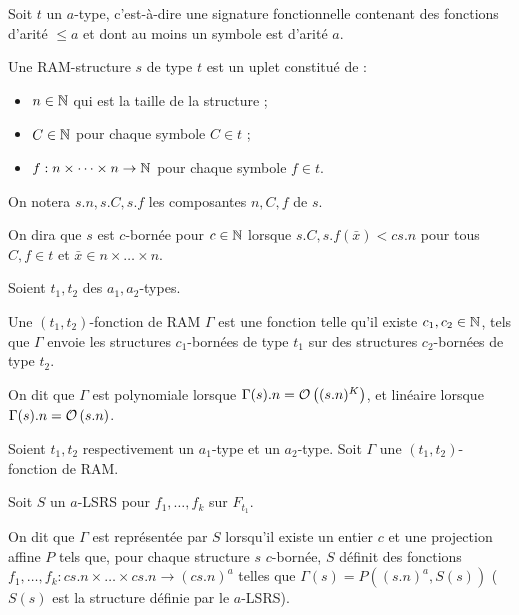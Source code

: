\documentclass{report}
\begin{document}
		\begin{definition}
			\label{def:RAM_data_structures_a}
			Soit $t$ un $a$-type, c'est-à-dire une signature fonctionnelle contenant des fonctions d'arité $\leqslant a$ et dont au moins un symbole est d'arité $a$. 
			
			Une RAM-structure $s$ de type $t$ est un uplet constitué de :
			\begin{itemize}[itemsep=-1mm]
				\item 	$n \in \mathbb{N}$ qui est la taille de la structure ;
				\item 	$C \in \mathbb{N}$ pour chaque symbole $C \in t$ ;
				\item 	$f : n\times \dots \times n \to \mathbb{N}$ pour chaque symbole $f \in t$.
			\end{itemize}
			
			On notera $s.n, s.C, s.f$ les composantes $n, C, f$ de $s$.
			
			On dira que $s$ est $c$-bornée pour $c\in\mathbb{N}$ lorsque $s.C, s.f\left(\bar{x}\right) < c s.n$ pour tous $C, f \in t$ et $\bar{x} \in n\times \dots \times n$.
		\end{definition}
		
		
		\begin{definition}
			\label{def:fonction_de_RAM_a}
			Soient $t_1, t_2$ des $a_1,a_2$-types. 
					
			Une $(t_1, t_2)$-fonction de RAM $\Gamma$ est une fonction telle qu'il existe $c_1, c_2 \in \mathbb{N}$, tels que $\Gamma$ envoie les structures $c_1$-bornées de type $t_1$ sur des structures $c_2$-bornées de type $t_2$\footnotemark.
			
			
			On dit que $\Gamma$ est polynomiale lorsque $\Gamma(s).n = \mathcal{O}\left( (s.n)^K \right)$, et linéaire lorsque $\Gamma(s).n = \mathcal{O}\left( s.n \right)$.
			
		\end{definition}
		
		
		\begin{definition}
			\label{def:representee_par_aLSRS}
			Soient $t_1, t_2$ respectivement un $a_1$-type et un $a_2$-type. Soit $\Gamma$ une $(t_1, t_2)$-fonction de RAM.
			
			Soit $S$ un $a$-LSRS pour $f_1, \dots, f_k$ sur $F_{t_1}$. 
			
			On dit que $\Gamma$ est représentée par $S$ lorsqu'il existe un entier $c$ et une projection affine $P$ tels que, pour chaque structure $s$ $c$-bornée, $S$ définit des fonctions $f_1, \dots, f_k : cs.n \times \dots \times cs.n \to (cs.n)^a$ telles que $\Gamma(s) = P((s.n)^a, S(s))$ ($S(s)$ est la structure définie par le $a$-LSRS).
		\end{definition}
		
\end{document}
